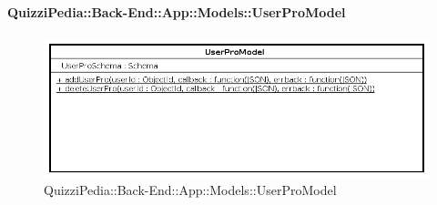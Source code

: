 \paragraph{QuizziPedia::Back-End::App::Models::UserProModel}
\label{QuizziPedia::Back-End::App::Models::UserProModel}
\begin{figure}[ht]
	\centering
	\includegraphics[scale=0.45]{UML/Classi/Back-End/QuizziPedia_Back-End_App_Models_userProModel.png}
	\caption{QuizziPedia::Back-End::App::Models::UserProModel}
\end{figure}
\FloatBarrier
